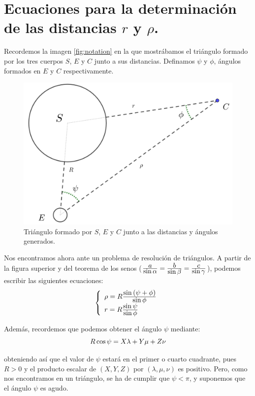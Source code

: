 \section{Ecuaciones para la determinación de las distancias $r$ y $\rho$.}
\label{sec:distancias_r_rho}
Recordemos la imagen \ref{fig:notation} en la que mostrábamos el triángulo formado por los tres cuerpos $S$, $E$ y $C$ junto a sus distancias. Definamos $\psi$ y $\phi$, ángulos formados en $E$ y $C$ respectivamente.

\begin{figure}[H]
\centering
\includegraphics[scale=0.15]{images/notation_angles.png}
\caption{Triángulo formado por $S$, $E$ y $C$ junto a las distancias y ángulos generados.}
\label{fig:notation_angles}
\end{figure}

Nos encontramos ahora ante un problema de resolución de triángulos. A partir de la figura superior y del teorema de los senos ($\frac{\displaystyle a}{\displaystyle \sin{\alpha}}=\frac{\displaystyle b}{\displaystyle \sin{\beta}}=\frac{\displaystyle c}{\displaystyle \sin{\gamma}}$), podemos escribir las siguientes ecuaciones:
\begin{align}
\left\{
\begin{array}{l}
	\rho=R\frac{\displaystyle \sin{(\psi+\phi)}}{\displaystyle \sin{\phi}}\\
	r=R\frac{\displaystyle \sin{\psi}}{\displaystyle \sin{\phi}}
\end{array}
\right.
\label{eq:triangle_relations_2}
\end{align}

Además, recordemos que podemos obtener el ángulo $\psi$ mediante:
\[
R\cos{\psi}=X\lambda+Y\mu+Z\nu\\
\]

\noindent obteniendo así que el valor de $\psi$ estará en el primer o cuarto cuadrante, pues $R>0$ y el producto escalar de $(X,Y,Z)$ por $(\lambda,\mu,\nu)$ es positivo. Pero, como nos encontramos en un triángulo, se ha de cumplir que $\psi<\pi$, y suponemos que el ángulo $\psi$ es agudo.\\

